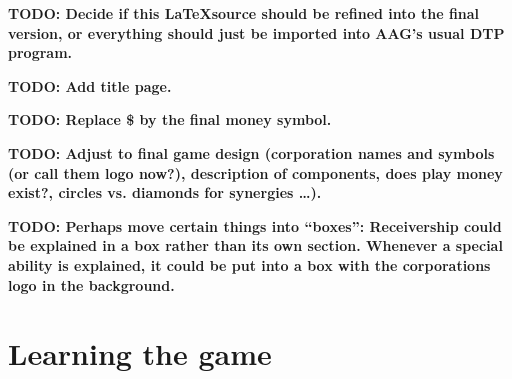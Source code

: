 \documentclass[10pt,final]{report}
\begin{document}

\textbf{TODO: Decide if this \LaTeX source should be refined into the
  final version, or everything should just be imported into AAG's
  usual DTP program.}

\textbf{TODO: Add title page.}

\textbf{TODO: Replace \$ by the final money symbol.}

\textbf{TODO: Adjust to final game design (corporation names and
  symbols (or call them logo now?), description of components, does
  play money exist?, circles vs. diamonds for synergies \dots).}

\textbf{TODO: Perhaps move certain things into ``boxes'': Receivership
  could be explained in a box rather than its own section. Whenever a
  special ability is explained, it could be put into a box with the
  corporations logo in the background.}

\setcounter{tocdepth}{1}
\setcounter{page}{3}
\tableofcontents

\chapter{Learning the game}
\end{document}
